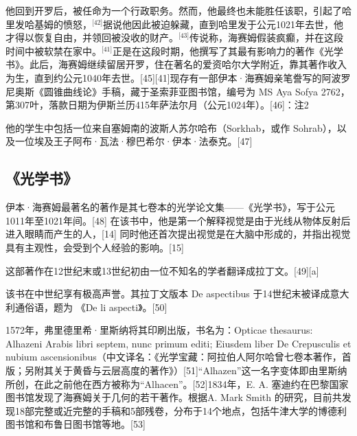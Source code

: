 他回到开罗后，被任命为一个行政职务。然而，他最终也未能胜任该职，引起了哈里发哈基姆的愤怒，\(^\text{[42]}\)据说他因此被迫躲藏，直到哈里发于公元1021年去世，他才得以恢复自由，并领回被没收的财产。\(^\text{[43]}\)传说称，海赛姆假装疯癫，并在这段时间中被软禁在家中。\(^\text{[41]}\)正是在这段时期，他撰写了其最有影响力的著作《光学书》。此后，海赛姆继续留居开罗，住在著名的爱资哈尔大学附近，靠其著作收入为生，直到约公元1040年去世。[45][41]现存有一部伊本·海赛姆亲笔誊写的阿波罗尼奥斯《圆锥曲线论》手稿，藏于圣索菲亚图书馆，编号为 MS Aya Sofya 2762，第307叶，落款日期为伊斯兰历415年萨法尔月（公元1024年）。[46]：注2

他的学生中包括一位来自塞姆南的波斯人苏尔哈布（Sorkhab，或作 Sohrab），以及一位埃及王子阿布·瓦法·穆巴希尔·伊本·法泰克。[47]
\subsection{《光学书》}
伊本·海赛姆最著名的著作是其七卷本的光学论文集——《光学书》，写于公元1011年至1021年间。[48] 在该书中，他是第一个解释视觉是由于光线从物体反射后进入眼睛而产生的人，[14] 同时他还首次提出视觉是在大脑中形成的，并指出视觉具有主观性，会受到个人经验的影响。[15]

这部著作在12世纪末或13世纪初由一位不知名的学者翻译成拉丁文。[49][a]

该书在中世纪享有极高声誉。其拉丁文版本 De aspectibus 于14世纪末被译成意大利通俗语，题为 《De li aspecti》。[50]

1572年，弗里德里希·里斯纳将其印刷出版，书名为：Opticae thesaurus: Alhazeni Arabis libri septem, nunc primum editi; Eiusdem liber De Crepusculis et nubium ascensionibus（中文译名：《光学宝藏：阿拉伯人阿尔哈曾七卷本著作，首版；另附其关于黄昏与云层高度的著作》）[51]“Alhazen”这一名字变体即由里斯纳所创，在此之前他在西方被称为“Alhacen”。[52]1834年，E. A. 塞迪约在巴黎国家图书馆发现了海赛姆关于几何的若干著作。根据A. Mark Smith 的研究，目前共发现18部完整或近完整的手稿和5部残卷，分布于14个地点，包括牛津大学的博德利图书馆和布鲁日图书馆等地。[53]
